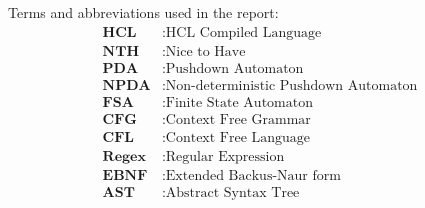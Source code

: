 
Terms and abbreviations used in the report:
\begin{align*}
	\textbf{HCL} &: \text{HCL Compiled Language} \\
    \textbf{NTH} &: \text{Nice to Have} \\
    \textbf{PDA} &: \text{Pushdown Automaton} \\
    \textbf{NPDA} &: \text{Non-deterministic Pushdown Automaton} \\
    \textbf{FSA} &: \text{Finite State Automaton} \\
    \textbf{CFG} &: \text{Context Free Grammar} \\
    \textbf{CFL} &: \text{Context Free Language} \\
    \textbf{Regex} &: \text{Regular Expression} \\
    \textbf{EBNF} &: \text{Extended Backus-Naur form} \\
    \textbf{AST} &: \text{Abstract Syntax Tree} \\
\end{align*}
